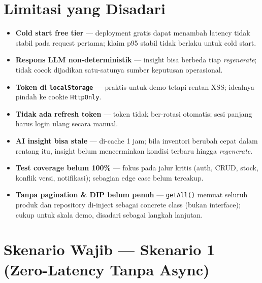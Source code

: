 \documentclass[11pt,a4paper]{article}
\begin{document}
\section*{Limitasi yang Disadari}

\begin{itemize}
  \item \textbf{Cold start free tier} --- deployment gratis dapat menambah latency tidak stabil pada request pertama; klaim p95 stabil tidak berlaku untuk cold start.
  \item \textbf{Respons LLM non-deterministik} --- insight bisa berbeda tiap \emph{regenerate}; tidak cocok dijadikan satu-satunya sumber keputusan operasional.
  \item \textbf{Token di \texttt{localStorage}} --- praktis untuk demo tetapi rentan XSS; idealnya pindah ke cookie \texttt{HttpOnly}.
  \item \textbf{Tidak ada refresh token} --- token tidak ber-rotasi otomatis; sesi panjang harus login ulang secara manual.
  \item \textbf{AI insight bisa stale} --- di-cache 1 jam; bila inventori berubah cepat dalam rentang itu, insight belum mencerminkan kondisi terbaru hingga \emph{regenerate}.
  \item \textbf{Test coverage belum 100\%} --- fokus pada jalur kritis (auth, CRUD, stock, konflik versi, notifikasi); sebagian edge case belum tercakup.
  \item \textbf{Tanpa pagination \& DIP belum penuh} --- \texttt{getAll()} memuat seluruh produk dan repository di-inject sebagai concrete class (bukan interface); cukup untuk skala demo, disadari sebagai langkah lanjutan.
\end{itemize}

\section*{Skenario Wajib --- Skenario 1 (Zero-Latency Tanpa Async)}
\end{document}
